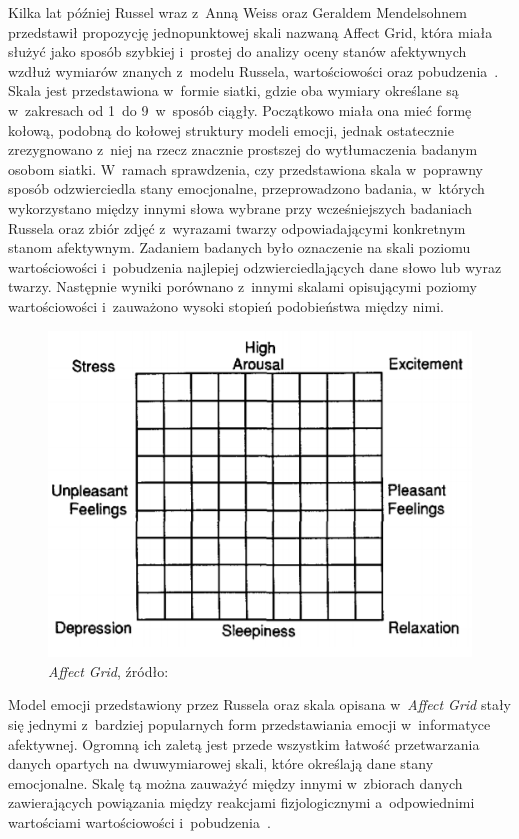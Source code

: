 Kilka lat później Russel wraz z~Anną Weiss oraz Geraldem Mendelsohnem przedstawił propozycję jednopunktowej skali nazwaną Affect Grid, która miała służyć jako sposób szybkiej i~prostej do analizy oceny stanów afektywnych wzdłuż wymiarów znanych z~modelu Russela, wartościowości oraz pobudzenia~\cite{affect_grid_russel_1989}. Skala jest przedstawiona w~formie siatki, gdzie oba wymiary określane są w~zakresach od 1~do 9~w~sposób ciągły. Początkowo miała ona mieć formę kołową, podobną do kołowej struktury modeli emocji, jednak ostatecznie zrezygnowano z~niej na rzecz znacznie prostszej do wytłumaczenia badanym osobom siatki. W~ramach sprawdzenia, czy przedstawiona skala w~poprawny sposób odzwierciedla stany emocjonalne, przeprowadzono badania, w~których wykorzystano między innymi słowa wybrane przy wcześniejszych badaniach Russela oraz zbiór zdjęć z~wyrazami twarzy odpowiadającymi konkretnym stanom afektywnym. Zadaniem badanych było oznaczenie na skali poziomu wartościowości i~pobudzenia najlepiej odzwierciedlających dane słowo lub wyraz twarzy. Następnie wyniki porównano z~innymi skalami opisującymi poziomy wartościowości i~zauważono wysoki stopień podobieństwa między nimi. 

\begin{figure}[h]
	\centering
	\includegraphics[width=0.5\linewidth]{images/affect_grid.png}
	\caption{\textit{Affect Grid}, źródło:~\cite{affect_grid_russel_1989}}
	\label{fig:affect_grid}
\end{figure}

Model emocji przedstawiony przez Russela oraz skala opisana w~\textit{Affect Grid} stały się jednymi z~bardziej popularnych form przedstawiania emocji w~informatyce afektywnej. Ogromną ich zaletą jest przede wszystkim łatwość przetwarzania danych opartych na dwuwymiarowej skali, które określają dane stany emocjonalne. Skalę tą można zauważyć między innymi w~zbiorach danych zawierających powiązania między reakcjami fizjologicznymi a~odpowiednimi wartościami wartościowości i~pobudzenia~\cite{deap_dataset_2011,amigos_dataset_2017}. 

